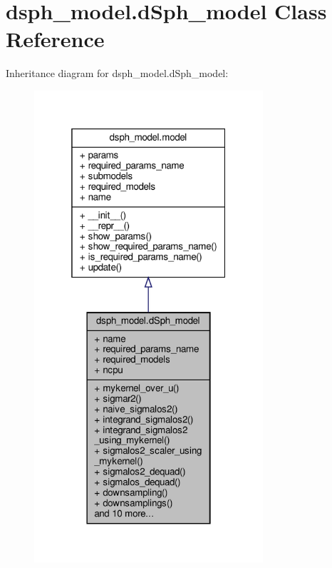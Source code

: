 \hypertarget{classdsph__model_1_1dSph__model}{}\section{dsph\+\_\+model.\+d\+Sph\+\_\+model Class Reference}
\label{classdsph__model_1_1dSph__model}


Inheritance diagram for dsph\+\_\+model.\+d\+Sph\+\_\+model\+:\nopagebreak
\begin{figure}[H]
\begin{center}
\leavevmode
\includegraphics[width=241pt]{d5/d96/classdsph__model_1_1dSph__model__inherit__graph}
\end{center}
\end{figure}


